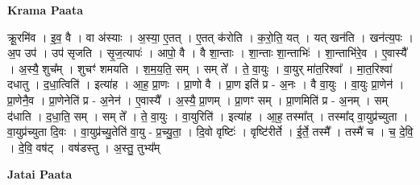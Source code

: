 \documentclass[17pt]{extarticle}
\begin{document}
\textbf{Krama Paata} \newline

क्रू॒रमि॑व । इ॒व॒ वै । वा अ॑स्याः । अ॒स्या॒ ए॒तत् । ए॒तत् क॑रोति । क॒रो॒ति॒ यत् । यत् खन॑ति । खन॑त्य॒पः । अ॒प उप॑ । उप॑ सृजति । सृ॒ज॒त्यापः॑ । आपो॒ वै । वै शा॒न्ताः । शा॒न्ताः शा॒न्ताभिः॑ । शा॒न्ताभि॑रे॒व । ए॒वास्यै᳚ । अ॒स्यै॒ शुच᳚म् । शुचꣳ॑ शमयति । श॒म॒य॒ति॒ सम् । सम् ते᳚ । ते॒ वा॒युः । वा॒युर् मा॑त॒रिश्वा᳚ । मा॒त॒रिश्वा॑ दधातु । द॒धा॒त्विति॑ । इत्या॑ह । आ॒ह॒ प्रा॒णः । प्रा॒णो वै । प्रा॒ण इति॑ प्र - अ॒नः । वै वा॒युः । वा॒युः प्रा॒णेन॑ । प्रा॒णेनै॒व । प्रा॒णेनेति॑ प्र - अ॒नेन॑ । ए॒वास्यै᳚ । अ॒स्यै॒ प्रा॒णम् । प्रा॒णꣳ सम् । प्रा॒णमिति॑ प्र - अ॒नम् । सम् द॑धाति । द॒धा॒ति॒ सम् । सम् ते᳚ । ते॒ वा॒युः । वा॒युरिति॑ । इत्या॑ह । आ॒ह॒ तस्मा᳚त् । तस्मा᳚द् वा॒युप्र॑च्युता । वा॒युप्र॑च्युता दि॒वः । वा॒युप्र॑च्यु॒तेति॑ वा॒यु - प्र॒च्यु॒ता॒ । दि॒वो वृष्टिः॑ । वृष्टि॑रीर्ते । ई॒र्ते॒ तस्मै᳚ । तस्मै॑ च । च॒ दे॒वि॒ । दे॒वि॒ वष॑ट् । वष॑डस्तु । अ॒स्तु॒ तुभ्य᳚म् \newline

\textbf{Jatai Paata} \newline
\end{document}
